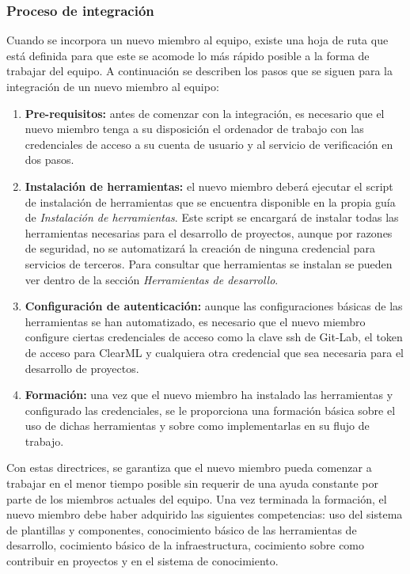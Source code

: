 \subsubsection{Proceso de integración}
Cuando se incorpora un nuevo miembro al equipo, existe una hoja de ruta que está
definida para que este se acomode lo más rápido posible a la forma de trabajar del
equipo. A continuación se describen los pasos que se siguen para la integración de
un nuevo miembro al equipo:
\begin{enumerate}
    \item \textbf{Pre-requisitos:} antes de comenzar con la integración, es necesario
    que el nuevo miembro tenga a su disposición el ordenador de trabajo con las
    credenciales de acceso a su cuenta de usuario y al servicio de verificación en
    dos pasos.
    \item \textbf{Instalación de herramientas:} el nuevo miembro deberá ejecutar el
    script de instalación de herramientas que se encuentra disponible en la propia
    guía de \textit{Instalación de herramientas}. Este script se encargará de instalar
    todas las herramientas necesarias para el desarrollo de proyectos, aunque por
    razones de seguridad, no se automatizará la creación de ninguna credencial para
    servicios de terceros. Para consultar que herramientas se instalan se pueden ver
    dentro de la sección \textit{Herramientas de desarrollo}.
    \item \textbf{Configuración de autenticación:} aunque las configuraciones básicas
    de las herramientas se han automatizado, es necesario que el nuevo miembro configure
    ciertas credenciales de acceso como la clave ssh de Git-Lab, el token de acceso para ClearML
    y cualquiera otra credencial que sea necesaria para el desarrollo de proyectos.
    \item \textbf{Formación:} una vez que el nuevo miembro ha instalado las herramientas
    y configurado las credenciales, se le proporciona una formación básica sobre el uso
    de dichas herramientas y sobre como implementarlas en su flujo de trabajo.
\end{enumerate}

Con estas directrices, se garantiza que el nuevo miembro pueda comenzar a trabajar
en el menor tiempo posible sin requerir de una ayuda constante por parte de los
miembros actuales del equipo. Una vez terminada la formación, el nuevo miembro
debe haber adquirido las siguientes competencias: uso del sistema de plantillas y componentes,
conocimiento básico de las herramientas de desarrollo, cocimiento básico de la infraestructura,
cocimiento sobre como contribuir en proyectos y en el sistema de conocimiento.

